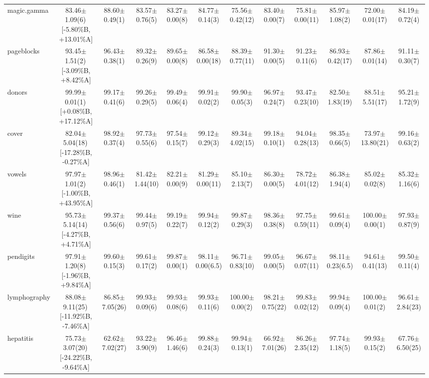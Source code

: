 \documentclass[conference]{IEEEtran}
\begin{document}
\begin{table}
{\begin{tabular}{lccccccccccc}
				magic.gamma & 83.46$\pm$1.09(6)\,[{-}5.80\%B, {+}13.01\%A] & 88.60$\pm$0.49(1) & 83.57$\pm$0.76(5) & 83.27$\pm$0.00(8) & 84.77$\pm$0.14(3) & 75.56$\pm$0.42(12) & 83.40$\pm$0.00(7) & 75.81$\pm$0.00(11) & 85.97$\pm$1.08(2) & 72.00$\pm$0.01(17) & 84.19$\pm$0.72(4) \\
				pageblocks & 93.45$\pm$1.51(2)\,[{-}3.09\%B, {+}8.42\%A] & 96.43$\pm$0.38(1) & 89.32$\pm$0.26(9) & 89.65$\pm$0.00(8) & 86.58$\pm$0.00(18) & 88.39$\pm$0.77(11) & 91.30$\pm$0.00(5) & 91.23$\pm$0.11(6) & 86.93$\pm$0.42(17) & 87.86$\pm$0.01(14) & 91.11$\pm$0.30(7) \\
				donors & 99.99$\pm$0.01(1)\,[{+}0.08\%B, {+}17.12\%A] & 99.17$\pm$0.41(6) & 99.26$\pm$0.29(5) & 99.49$\pm$0.06(4) & 99.91$\pm$0.02(2) & 99.90$\pm$0.05(3) & 96.97$\pm$0.24(7) & 93.47$\pm$0.23(10) & 82.50$\pm$1.83(19) & 88.51$\pm$5.51(17) & 95.21$\pm$1.72(9) \\
				cover & 82.04$\pm$5.04(18)\,[{-}17.28\%B, {-}0.27\%A] & 98.92$\pm$0.37(4) & 97.73$\pm$0.55(6) & 97.54$\pm$0.15(7) & 99.12$\pm$0.29(3) & 89.34$\pm$4.02(15) & 99.18$\pm$0.10(1) & 94.04$\pm$0.28(13) & 98.35$\pm$0.66(5) & 73.97$\pm$13.80(21) & 99.16$\pm$0.63(2) \\
				vowels & 97.97$\pm$1.01(2)\,[{-}1.00\%B, {+}43.95\%A] & 98.96$\pm$0.46(1) & 81.42$\pm$1.44(10) & 82.21$\pm$0.00(9) & 81.29$\pm$0.00(11) & 85.10$\pm$2.13(7) & 86.30$\pm$0.00(5) & 78.72$\pm$4.01(12) & 86.38$\pm$1.94(4) & 85.02$\pm$0.02(8) & 85.32$\pm$1.16(6) \\
				wine & 95.73$\pm$5.14(14)\,[{-}4.27\%B, {+}4.71\%A] & 99.37$\pm$0.56(6) & 99.44$\pm$0.97(5) & 99.19$\pm$0.22(7) & 99.94$\pm$0.12(2) & 99.87$\pm$0.29(3) & 98.36$\pm$0.38(8) & 97.75$\pm$0.59(11) & 99.61$\pm$0.09(4) & 100.00$\pm$0.00(1) & 97.93$\pm$0.87(9) \\
				pendigits & 97.91$\pm$1.20(8)\,[{-}1.96\%B, {+}9.84\%A] & 99.60$\pm$0.15(3) & 99.61$\pm$0.17(2) & 99.87$\pm$0.00(1) & 98.11$\pm$0.00(6.5) & 96.71$\pm$0.83(10) & 99.05$\pm$0.00(5) & 96.67$\pm$0.07(11) & 98.11$\pm$0.23(6.5) & 94.61$\pm$0.41(13) & 99.50$\pm$0.11(4) \\
				lymphography & 88.08$\pm$9.11(25)\,[{-}11.92\%B, {-}7.46\%A] & 86.85$\pm$7.05(26) & 99.93$\pm$0.09(6) & 99.93$\pm$0.08(6) & 99.93$\pm$0.11(6) & 100.00$\pm$0.00(2) & 98.21$\pm$0.75(22) & 99.83$\pm$0.02(12) & 99.94$\pm$0.09(4) & 100.00$\pm$0.01(2) & 96.61$\pm$2.84(23) \\
				hepatitis & 75.73$\pm$3.07(20)\,[{-}24.22\%B, {-}9.64\%A] & 62.62$\pm$7.02(27) & 93.22$\pm$3.90(9) & 96.46$\pm$1.46(6) & 99.88$\pm$0.24(3) & 99.94$\pm$0.13(1) & 66.92$\pm$7.01(26) & 86.26$\pm$2.35(12) & 97.74$\pm$1.18(5) & 99.93$\pm$0.15(2) & 67.76$\pm$6.50(25) \\

\end{tabular}}
\end{table}
\end{document}
